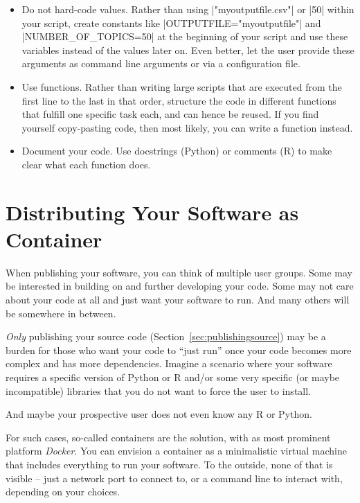 \begin{itemize}
\item Do not hard-code values. Rather than using |"myoutputfile.csv"| or |50| within your script, create constants like |OUTPUTFILE="myoutputfile"| and |NUMBER_OF_TOPICS=50| at the beginning of your script and use these variables instead of the values later on. Even better, let the user provide these arguments as command line arguments or via a configuration file.
\item Use functions. Rather than writing large scripts that are executed from the first line to the last in that order, structure the code in different functions that fulfill one specific task each, and can hence be reused. If you find yourself copy-pasting code, then most likely, you can write a function instead.
\item Document your code. Use docstrings (Python) or comments (R) to make clear what each function does.
\end{itemize}


%

\section{Distributing Your Software as Container}
\label{sec:container}
When publishing your software, you can think of multiple user
groups. Some may be interested in building on and further developing
your code. Some may not care about your code at all and just want your
software to run. And many others will be somewhere in between.

\emph{Only} publishing your source code (Section~\ref{sec:publishingsource}) may
be a burden for those who want your code to ``just run'' once your
code becomes more complex and has more dependencies. Imagine a
scenario where your software requires a specific version of
Python or R and/or some very specific (or maybe incompatible) libraries
that you do not want to force the user to install.

And maybe your prospective user does not even know any R or Python.

For such cases, so-called containers are the solution, with as most
prominent platform \emph{Docker}. You can envision a container as a
minimalistic virtual machine that includes everything to run your
software. To the outside, none of that is visible -- just a network
port to connect to, or a command line to interact with, depending on
your choices.

